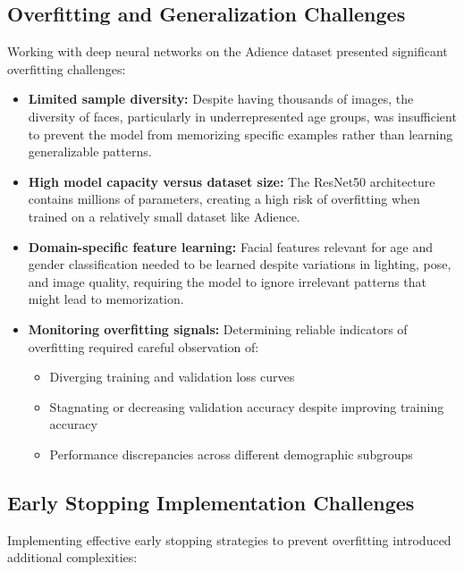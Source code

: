 \documentclass{article}
\begin{document}
\subsection{Overfitting and Generalization Challenges}
Working with deep neural networks on the Adience dataset presented significant overfitting challenges:

\begin{itemize}
    \item \textbf{Limited sample diversity:} Despite having thousands of images, the diversity of faces, particularly in underrepresented age groups, was insufficient to prevent the model from memorizing specific examples rather than learning generalizable patterns.

    \item \textbf{High model capacity versus dataset size:} The ResNet50 architecture contains millions of parameters, creating a high risk of overfitting when trained on a relatively small dataset like Adience.

    \item \textbf{Domain-specific feature learning:} Facial features relevant for age and gender classification needed to be learned despite variations in lighting, pose, and image quality, requiring the model to ignore irrelevant patterns that might lead to memorization.

    \item \textbf{Monitoring overfitting signals:} Determining reliable indicators of overfitting required careful observation of:
    \begin{itemize}
        \item Diverging training and validation loss curves
        \item Stagnating or decreasing validation accuracy despite improving training accuracy
        \item Performance discrepancies across different demographic subgroups
    \end{itemize}
\end{itemize}

\subsection{Early Stopping Implementation Challenges}
Implementing effective early stopping strategies to prevent overfitting introduced additional complexities:
\end{document}
